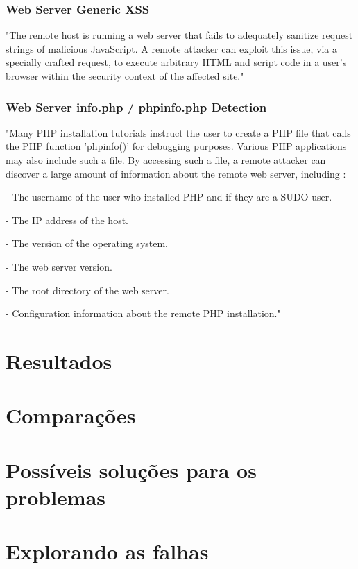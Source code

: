 \documentclass[
	12pt,				%
	openright,			%
	twoside,			%
	a4paper,			%
	english,			%
	french,				%
	spanish,			%
	brazil				%
	]{abntex2}
\begin{document}
	\subsection{Web Server Generic XSS}
"The remote host is running a web server that fails to adequately
sanitize request strings of malicious JavaScript. A remote attacker
can exploit this issue, via a specially crafted request, to execute
arbitrary HTML and script code in a user's browser within the security
context of the affected site."
\subsection{Web Server info.php / phpinfo.php Detection}
"Many PHP installation tutorials instruct the user to create a PHP file
that calls the PHP function 'phpinfo()' for debugging purposes. 
Various PHP applications may also include such a file.  By accessing
such a file, a remote attacker can discover a large amount of
information about the remote web server, including :

- The username of the user who installed PHP and if they
are a SUDO user.

- The IP address of the host.

- The version of the operating system.

- The web server version.

- The root directory of the web server. 

- Configuration information about the remote PHP 
installation."

\chapter{Resultados}

\chapter{Comparações}

\chapter{Possíveis soluções para os problemas}

\chapter{Explorando as falhas}

\end{document}

